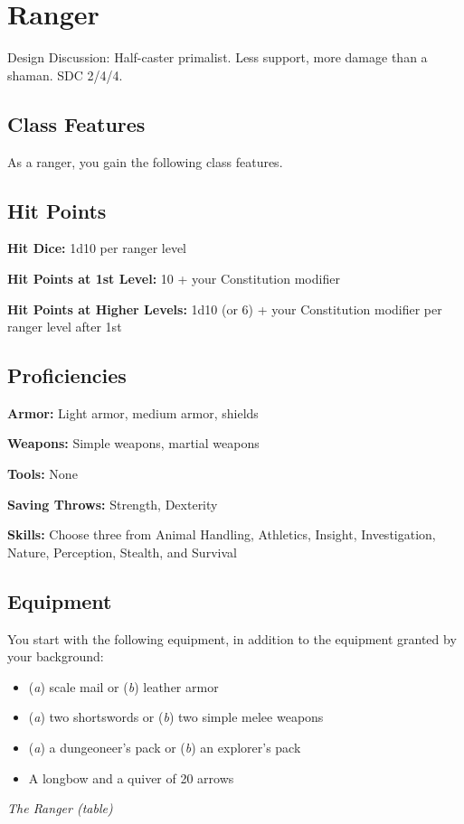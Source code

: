 \section{Ranger}

Design Discussion: Half-caster primalist. Less support, more damage than a shaman. SDC 2/4/4.

\subsection{Class Features}

As a ranger, you gain the following class features.

\subsection{Hit Points}

\textbf{Hit Dice:} 1d10 per ranger level

\textbf{Hit Points at 1st Level:} 10 + your Constitution modifier

\textbf{Hit Points at Higher Levels:} 1d10 (or 6) + your Constitution modifier per ranger level after 1st

\subsection{Proficiencies}

\textbf{Armor:} Light armor, medium armor, shields

\textbf{Weapons:} Simple weapons, martial weapons

\textbf{Tools:} None

\textbf{Saving Throws:} Strength, Dexterity

\textbf{Skills:} Choose three from Animal Handling, Athletics, Insight, Investigation, Nature, Perception, Stealth, and Survival

\subsection{Equipment}

You start with the following equipment, in addition to the equipment granted by your background:
\begin{itemize}
\item (\textit{a}) scale mail or (\textit{b}) leather armor
\item (\textit{a}) two shortswords or (\textit{b}) two simple melee weapons
\item (\textit{a}) a dungeoneer’s pack or (\textit{b}) an explorer’s pack
\item A longbow and a quiver of 20 arrows
\end{itemize}
\textit{The Ranger (table)}

